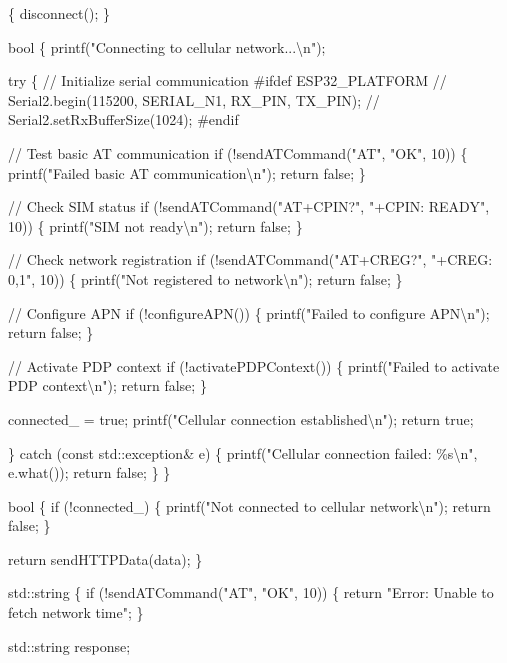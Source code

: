  \{ disconnect(); \}

bool  \{ printf("{}\+Connecting to cellular network...\textbackslash{}n"{});

try \{ // Initialize serial communication \#ifdef ESP32\+\_\+\+PLATFORM // Serial2.\+begin(115200, SERIAL\+\_\+N1, RX\+\_\+\+PIN, TX\+\_\+\+PIN); // Serial2.\+set\+Rx\+Buffer\+Size(1024); \#endif

// Test basic AT communication if (!send\+ATCommand("{}\+AT"{}, "{}\+OK"{}, 10)) \{ printf("{}\+Failed basic AT communication\textbackslash{}n"{}); return false; \}

// Check SIM status if (!send\+ATCommand("{}\+AT+\+CPIN?"{}, "{}+\+CPIN\+: READY"{}, 10)) \{ printf("{}\+SIM not ready\textbackslash{}n"{}); return false; \}

// Check network registration if (!send\+ATCommand("{}\+AT+\+CREG?"{}, "{}+\+CREG\+: 0,1"{}, 10)) \{ printf("{}\+Not registered to network\textbackslash{}n"{}); return false; \}

// Configure APN if (!configure\+APN()) \{ printf("{}\+Failed to configure APN\textbackslash{}n"{}); return false; \}

// Activate PDP context if (!activate\+PDPContext()) \{ printf("{}\+Failed to activate PDP context\textbackslash{}n"{}); return false; \}

connected\+\_\+ = true; printf("{}\+Cellular connection established\textbackslash{}n"{}); return true;

\} catch (const std\+::exception\& e) \{ printf("{}\+Cellular connection failed\+: \%s\textbackslash{}n"{}, e.\+what()); return false; \} \}

bool  \{ if (!connected\+\_\+) \{ printf("{}\+Not connected to cellular network\textbackslash{}n"{}); return false; \}

return send\+HTTPData(data); \}

std\+::string  \{ if (!send\+ATCommand("{}\+AT"{}, "{}\+OK"{}, 10)) \{ return "{}\+Error\+: Unable to fetch network time"{}; \}

std\+::string response;

